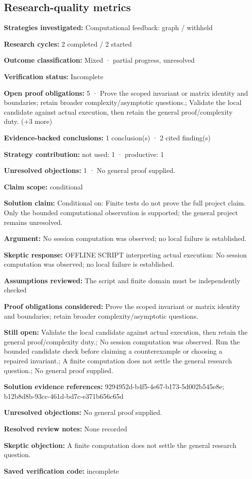 \documentclass[11pt]{article}
\begin{document}
\subsection{Research-quality metrics}
\textbf{Strategies investigated:} Computational feedback: graph / withheld\par
\textbf{Research cycles:} 2 completed / 2 started\par
\textbf{Outcome classification:} Mixed · partial progress, unresolved\par
\textbf{Verification status:} Incomplete\par
\textbf{Open proof obligations:} 5 · Prove the scoped invariant or matrix identity and boundaries; retain broader complexity/asymptotic questions.; Validate the local candidate against actual execution, then retain the general proof/complexity duty. (+3 more)\par
\textbf{Evidence-backed conclusions:} 1 conclusion(s) · 2 cited finding(s)\par
\textbf{Strategy contribution:} not used: 1 · productive: 1\par
\textbf{Unresolved objections:} 1 · No general proof supplied.\par
\textbf{Claim scope:} conditional\par
\textbf{Solution claim:} Conditional on: Finite tests do not prove the full project claim. Only the bounded computational observation is supported; the general project remains unresolved.\par
\textbf{Argument:} No session computation was observed; no local failure is established.\par
\textbf{Skeptic response:} OFFLINE SCRIPT interpreting actual execution: No session computation was observed; no local failure is established.\par
\textbf{Assumptions reviewed:} The script and finite domain must be independently checked\par
\textbf{Proof obligations considered:} Prove the scoped invariant or matrix identity and boundaries; retain broader complexity/asymptotic questions.\par
\textbf{Still open:} Validate the local candidate against actual execution, then retain the general proof/complexity duty.; No session computation was observed. Run the bounded candidate check before claiming a counterexample or choosing a repaired invariant.; A finite computation does not settle the general research question.; No general proof supplied.\par
\textbf{Solution evidence references:} 9294952d-b4f5-4e67-b173-5d002b545e8e; b12b8d8b-93cc-461d-bd7c-e371b656c65d\par
\textbf{Unresolved objections:} No general proof supplied.\par
\textbf{Resolved review notes:} None recorded\par
\textbf{Skeptic objection:} A finite computation does not settle the general research question.\par
\textbf{Saved verification code:} incomplete\par
\end{document}
